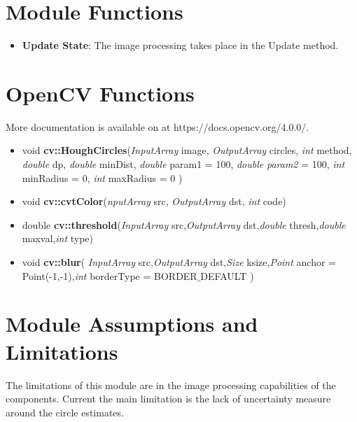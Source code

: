 

\section{Module Functions}

\begin{itemize}
	\item \textbf{Update State}: The image processing takes place in the Update method.
\end{itemize}


\section{OpenCV Functions}

More documentation is available on at https://docs.opencv.org/4.0.0/.
\begin{itemize}
	\item void \textbf{cv::HoughCircles}(\textit{InputArray} 	image, \textit{OutputArray} 	circles, \textit{int} 	method, \textit{double} 	dp, \textit{double} 	minDist, \textit{double} 	param1 = 100, \textit{double} 	\textit{param2} = 100, \textit{int} 	minRadius = 0, \textit{int} 	maxRadius = 0 )	
	\item void  \textbf{cv::cvtColor}(\textit{nputArray} 	src, \textit{OutputArray} 	dst, \textit{int} 	code)
	\item double \textbf{cv::threshold}(\textit{InputArray} 	src,\textit{OutputArray} 	dst,\textit{double} 	thresh,\textit{double} 	maxval,\textit{int} 	type)		
	\item void \textbf{cv::blur}(	\textit{InputArray} 	src,\textit{OutputArray}	dst,\textit{Size} 	ksize,\textit{Point} 	anchor = Point(-1,-1),\textit{int} 	borderType = BORDER$\_$DEFAULT )	
\end{itemize}

\section{Module Assumptions and Limitations}
The limitations of this module are in the image processing capabilities of the components.
Current the main limitation is the lack of uncertainty measure around the circle estimates.